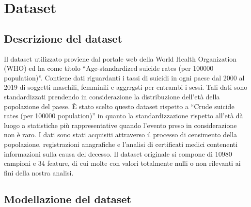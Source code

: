 \documentclass[conference]{IEEEtran}
\begin{document}
\section{Dataset}

\subsection{Descrizione del dataset}

Il dataset utilizzato proviene dal portale web della World Health Organization (WHO)
ed ha come titolo ``Age-standardized suicide rates (per 100000 population)''\cite{b4}.
Contiene dati riguardanti i tassi di suicidi in ogni paese dal 2000 al 2019 di soggetti
maschili, femminili e aggrrgsti per entrambi i sessi. Tali dati sono standardizzati
prendendo in considerazione la distribuzione dell'età della popolazione del paese.
\`E stato scelto questo dataset rispetto a ``Crude suicide rates (per 100000 population)''
in quanto la standardizzazione rispetto all'età dà luogo a statistiche più rappresentative
quando l'evento preso in considerazione non è raro\cite{b5}.
I dati sono stati acquisiti attraverso il processo di censimento della popolazione,
registrazioni anagrafiche e l'analisi di certificati medici contenenti informazioni
sulla causa del decesso.
Il dataset originale si compone di 10980 campioni e 34 feature,
di cui molte con valori totalmente nulli o non rilevanti ai fini della nostra analisi.

\subsection{Modellazione del dataset}
\end{document}
